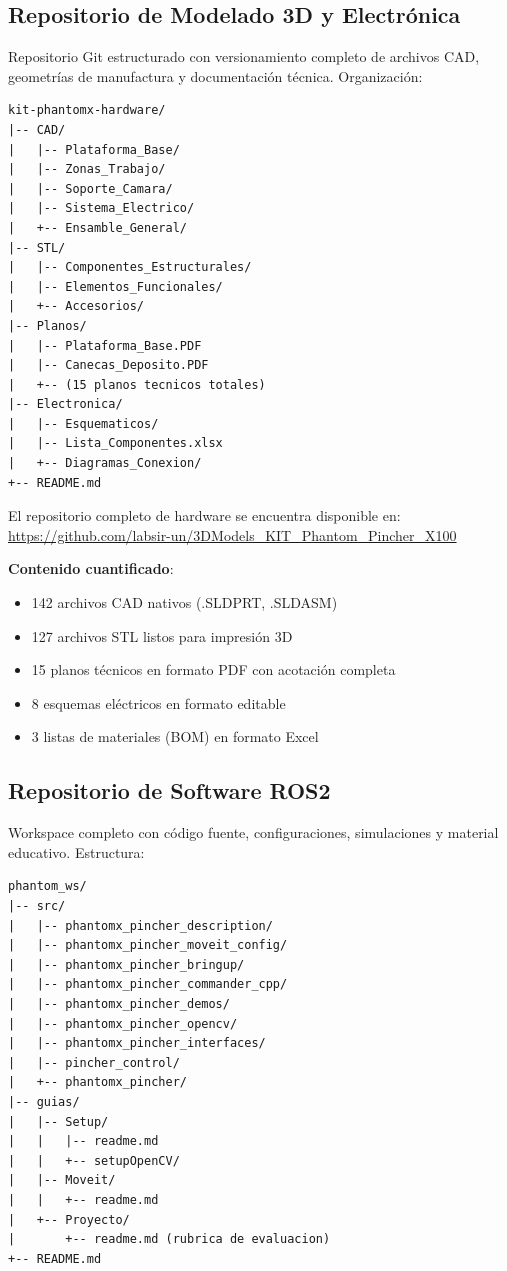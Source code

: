 \subsection{Repositorio de Modelado 3D y Electrónica}

Repositorio Git estructurado con versionamiento completo de archivos CAD, geometrías de manufactura y documentación técnica. Organización:

\begin{verbatim}
kit-phantomx-hardware/
|-- CAD/
|   |-- Plataforma_Base/
|   |-- Zonas_Trabajo/
|   |-- Soporte_Camara/
|   |-- Sistema_Electrico/
|   +-- Ensamble_General/
|-- STL/
|   |-- Componentes_Estructurales/
|   |-- Elementos_Funcionales/
|   +-- Accesorios/
|-- Planos/
|   |-- Plataforma_Base.PDF
|   |-- Canecas_Deposito.PDF
|   +-- (15 planos tecnicos totales)
|-- Electronica/
|   |-- Esquematicos/
|   |-- Lista_Componentes.xlsx
|   +-- Diagramas_Conexion/
+-- README.md
\end{verbatim}

El repositorio completo de hardware se encuentra disponible en: \url{https://github.com/labsir-un/3DModels_KIT_Phantom_Pincher_X100}

\textbf{Contenido cuantificado}:
\begin{itemize}
    \item 142 archivos CAD nativos (.SLDPRT, .SLDASM)
    \item 127 archivos STL listos para impresión 3D
    \item 15 planos técnicos en formato PDF con acotación completa
    \item 8 esquemas eléctricos en formato editable
    \item 3 listas de materiales (BOM) en formato Excel
\end{itemize}

\subsection{Repositorio de Software ROS2}

Workspace completo con código fuente, configuraciones, simulaciones y material educativo. Estructura:

\begin{verbatim}
phantom_ws/
|-- src/
|   |-- phantomx_pincher_description/
|   |-- phantomx_pincher_moveit_config/
|   |-- phantomx_pincher_bringup/
|   |-- phantomx_pincher_commander_cpp/
|   |-- phantomx_pincher_demos/
|   |-- phantomx_pincher_opencv/
|   |-- phantomx_pincher_interfaces/
|   |-- pincher_control/
|   +-- phantomx_pincher/
|-- guias/
|   |-- Setup/
|   |   |-- readme.md
|   |   +-- setupOpenCV/
|   |-- Moveit/
|   |   +-- readme.md
|   +-- Proyecto/
|       +-- readme.md (rubrica de evaluacion)
+-- README.md
\end{verbatim}

